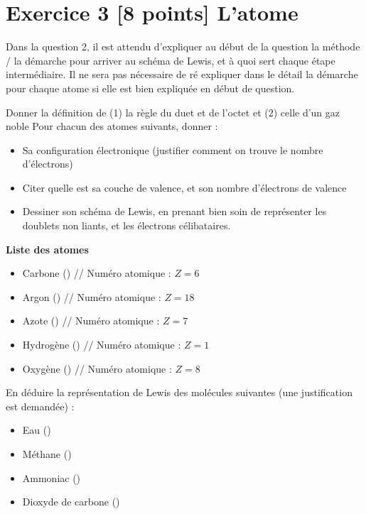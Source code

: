 \documentclass{exam}
\begin{document}
\section*{Exercice 3 [8 points] L'atome}

\begin{tcolorbox}[colback=gray!10!white, colframe=black, title=Note importante]
  Dans la question 2, il est attendu d'expliquer au début de la question la méthode / la démarche pour arriver au schéma de Lewis, et à quoi sert chaque étape intermédiaire.
  Il ne sera pas nécessaire de ré expliquer dans le détail la démarche pour chaque atome si elle est bien expliquée en début de question. 
\end{tcolorbox}

\begin{questions}

\question[1] Donner la définition de (1) la règle du duet et de l'octet et (2) celle d'un gaz noble
\question[4] Pour chacun des atomes suivants, donner : 

\begin{itemize}[noitemsep]
  \item Sa configuration électronique (justifier comment on trouve le nombre d'électrons)
  \item Citer quelle est sa couche de valence, et son nombre d'électrons de valence 
  \item Dessiner son schéma de Lewis, en prenant bien soin de représenter les doublets non liants, et les électrons célibataires. 
\end{itemize}

\textbf{Liste des atomes}

\begin{itemize}[noitemsep]
  \item Carbone () // Numéro atomique : $Z = 6$
  \item Argon () // Numéro atomique : $Z = 18$
  \item Azote () // Numéro atomique : $Z = 7$
  \item Hydrogène () // Numéro atomique : $Z = 1$
  \item Oxygène () // Numéro atomique : $Z = 8$
\end{itemize}

\question[3] En déduire la représentation de Lewis des molécules suivantes (une justification est demandée) : 

\begin{itemize}[noitemsep]
  \item Eau ()
  \item Méthane ()
  \item Ammoniac ()
  \item Dioxyde de carbone ()
\end{itemize}

\end{questions}
\end{document}
